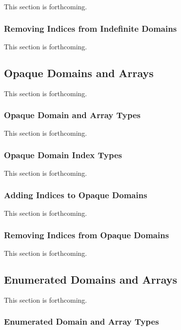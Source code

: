 This section is forthcoming.

\subsubsection{Removing Indices from Indefinite Domains}
\label{Removing_Indices_from_Indefinite_Domains}

This section is forthcoming.

\subsection{Opaque Domains and Arrays}
\label{Opaque_Domains_and_Arrays}

This section is forthcoming.

\subsubsection{Opaque Domain and Array Types}
\label{Opaque_Domain_and_Array_Types}

This section is forthcoming.

\subsubsection{Opaque Domain Index Types}
\label{Opaque_Domain_Index_Types}

This section is forthcoming.

\subsubsection{Adding Indices to Opaque Domains}
\label{Adding_Indices_to_Opaque_Domains}

This section is forthcoming.

\subsubsection{Removing Indices from Opaque Domains}
\label{Removing_Indices_from_Opaque_Domains}

This section is forthcoming.

\subsection{Enumerated Domains and Arrays}
\label{Enumerated_Domains_and_Arrays}

This section is forthcoming.

\subsubsection{Enumerated Domain and Array Types}
\label{Enumerated_Domain_and_Array_Types}

